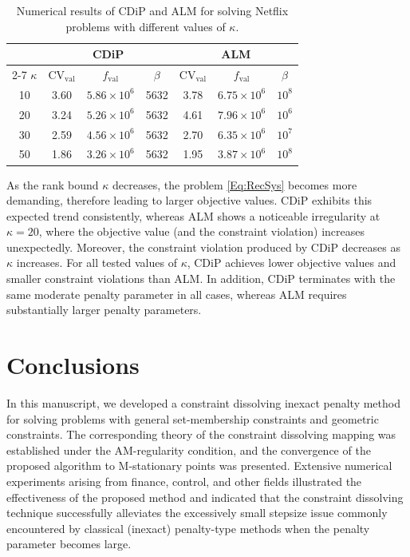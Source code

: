\documentclass[11pt,a4paper,reqno]{amsart}
\begin{document}
{\begin{table}[htbp]
\centering
\begin{tabular}{c|ccc|ccc}
\toprule
& \multicolumn{3}{c|}{CDiP} & \multicolumn{3}{c}{ALM} \\
\cline{2-7}
$\kappa$ & $\text{CV}_{\mathrm{val}}$ & $f_{\mathrm{val}}$ & $\beta$
         & $\text{CV}_{\mathrm{val}}$ & $f_{\mathrm{val}}$ & $\beta$ \\
\midrule
10 & 3.60 & $5.86 \times 10^6$  & 5632 & 3.78  & $6.75 \times 10^6$ & $10^8$ \\
20 & 3.24 & $5.26 \times 10^6$  &  5632 & 4.61 & $7.96 \times 10^6$  & $10^6$ \\
30 & 2.59 &  $4.56 \times 10^6$ &  5632 & 2.70 & $6.35 \times 10^6$ & $10^7$ \\
50 & 1.86 & $3.26 \times 10^6$ & 5632  & 1.95 &  $3.87 \times 10^6$ & $10^8$ \\
\bottomrule
\end{tabular}
\caption{Numerical results of CDiP and ALM for solving Netflix problems with different values of $\kappa$.}
\label{tab:rank_results}
\end{table}


As the rank bound $\kappa$ decreases, the problem \eqref{Eq:RecSys} becomes more demanding, therefore leading to larger objective values. CDiP exhibits this expected trend consistently, whereas ALM shows a noticeable irregularity at $\kappa=20$, where the objective value (and the constraint violation) increases unexpectedly. Moreover, the constraint violation produced by CDiP decreases as $\kappa$ increases. For all tested values of $\kappa$, CDiP achieves lower objective values and smaller constraint violations than ALM. In addition, CDiP terminates with the same moderate penalty parameter in all cases, whereas ALM requires substantially larger penalty parameters. 


\section{Conclusions}\label{Sub:con}
In this manuscript, we developed a constraint dissolving inexact penalty method for solving problems with general set-membership constraints and geometric constraints. The corresponding theory of the constraint dissolving mapping was established under the AM-regularity condition, and the convergence of the proposed algorithm to M-stationary points was presented. Extensive numerical experiments arising from finance, control, and other fields illustrated the effectiveness of the proposed method and indicated that the constraint dissolving technique successfully alleviates the excessively small stepsize issue commonly encountered by classical (inexact) penalty-type methods when the penalty parameter becomes large.

}
\end{document}
